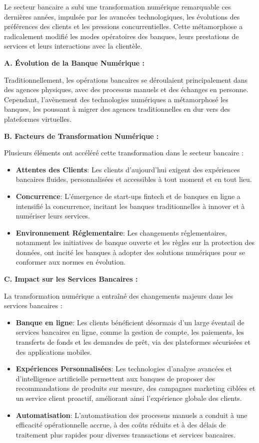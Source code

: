 \hspace{\parindent}Le secteur bancaire a subi une transformation numérique remarquable ces dernières années, impulsée par les avancées technologiques, les évolutions des préférences des clients et les pressions concurrentielles. Cette métamorphose a radicalement modifié les modes opératoires des banques, leurs prestations de services et leurs interactions avec la clientèle.

\textbf{A. Évolution de la Banque Numérique :}

Traditionnellement, les opérations bancaires se déroulaient principalement dans des agences physiques, avec des processus manuels et des échanges en personne. Cependant, l'avènement des technologies numériques a métamorphosé les banques, les poussant à migrer des agences traditionnelles en dur vers des plateformes virtuelles.


\textbf{B. Facteurs de Transformation Numérique :}

Plusieurs éléments ont accéléré cette transformation dans le secteur bancaire :
\begin{itemize}
    \item \textbf{Attentes des Clients}: Les clients d'aujourd'hui exigent des expériences bancaires fluides, personnalisées et accessibles à tout moment et en tout lieu.
    \item \textbf{Concurrence}: L'émergence de start-ups fintech et de banques en ligne a intensifié la concurrence, incitant les banques traditionnelles à innover et à numériser leurs services.
    \item \textbf{Environnement Réglementaire}: Les changements réglementaires, notamment les initiatives de banque ouverte et les règles sur la protection des données, ont incité les banques à adopter des solutions numériques pour se conformer aux normes en évolution.
\end{itemize}


\textbf{C. Impact sur les Services Bancaires :}

La transformation numérique a entraîné des changements majeurs dans les services bancaires :
\begin{itemize}
    \item \textbf{Banque en ligne}: Les clients bénéficient désormais d'un large éventail de services bancaires en ligne, comme la gestion de compte, les paiements, les transferts de fonds et les demandes de prêt, via des plateformes sécurisées et des applications mobiles.
    \item \textbf{Expériences Personnalisées}: Les technologies d'analyse avancées et d'intelligence artificielle permettent aux banques de proposer des recommandations de produits sur mesure, des campagnes marketing ciblées et un service client proactif, améliorant ainsi l'expérience globale des clients.
    \item \textbf{Automatisation}: L'automatisation des processus manuels a conduit à une efficacité opérationnelle accrue, à des coûts réduits et à des délais de traitement plus rapides pour diverses transactions et services bancaires.
\end{itemize}



